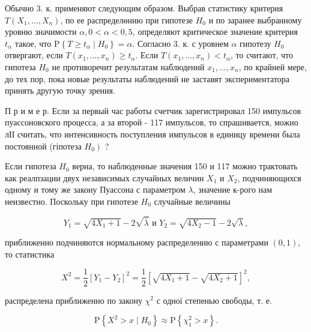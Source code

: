 \documentclass[10pt]{article}
\begin{document}
Обычно 3. к. применяют следующим образом. Выбрав статистику критерия $T\left(X_{1}, \ldots, X_{n}\right)$, по ее распределөнию при гипотезе $H_{0}$ и по заранее выбранному уровню значимости $\alpha, 0<\alpha<0,5$, определяют критическое значение критерия $t_{\alpha}$ такое, что $\mathrm{P}\left\{T \geqslant t_{\alpha} \mid H_{0}\right\}=\alpha$. Согласно 3. к. с уровнем $\alpha$ гипотезу $H_{0}$ отвергают, если $T\left(x_{1}, \ldots, x_{n}\right) \geqslant t_{\alpha}$. Если $T\left(x_{1}, \ldots, x_{n}\right)<t_{\alpha}$, то считают, что гипотеза $H_{0}$ не противоречит результатам наблюдений $x_{1}, \ldots, x_{n}$, по крайней мере, до тех пор, пока новые результаты наблюдений не заставят экспериментатора принять другую точку зрения.



П р и м е р. Если за первый час работы счетчик зарегистрировал 150 импульсов пуассоновского процесса, а за второй - 117 импульсов, то спрашивается, можно лІІ считать, что интенсивность поступления импульсов в единицу времени была постоянной (гіпотеза $\left.H_{0}\right)$ ?



Если гипотеза $H_{0}$ верна, то наблюденные значения 150 и 117 можно трактовать как реалпзации двух независимых случайных величин $X_{1}$ и $X_{2}$, подчиняющихся одному и тому же закону Пуассона с параметром $\lambda$, значение к-рого нам неизвестно. Поскольку при гипотезе $H_{0}$ случайные величины



\[

Y_{1}=\sqrt{4 X_{1}+1}-2 \sqrt{\bar{\lambda}} \text { и } Y_{2}=\sqrt{4 X_{2}-1}-2 \sqrt{\lambda},

\]



приближенно подчиняются нормальному распределению с параметрами $(0,1)$, то статистика



\[

X^{2}=\frac{1}{2}\left[Y_{1}-Y_{2}\right]^{2}=\frac{1}{2}\left[\sqrt{4 X_{1}+1}-\sqrt{4 X_{2}+1}\right]^{2},

\]



распределена приближенно по закону $\chi^{2}$ с одної степенью свободы, т. е.



\[

\mathrm{P}\left\{X^{2}>x \mid H_{0}\right\} \approx \mathrm{P}\left\{\chi_{1}^{2}>x\right\} .

\]
\end{document}
